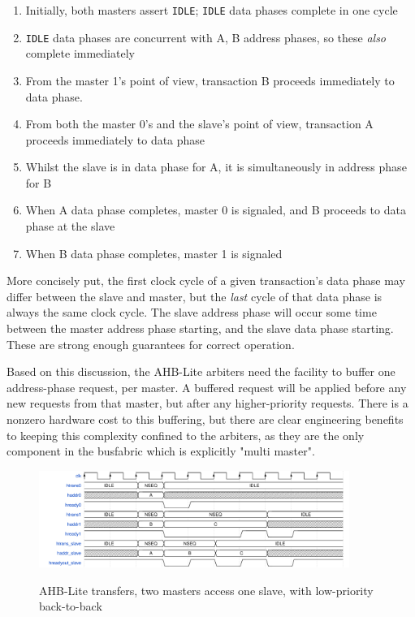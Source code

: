 \documentclass[notitlepage]{article}
\begin{document}
\begin{enumerate}
	\item Initially, both masters assert \texttt{IDLE}; \texttt{IDLE} data phases complete in one cycle
	\item \texttt{IDLE} data phases are concurrent with A, B address phases, so these \textit{also} complete immediately
	\item From the master 1's point of view, transaction B proceeds immediately to data phase.
	\item From both the master 0's and the slave's point of view, transaction A proceeds immediately to data phase
	\item Whilst the slave is in data phase for A, it is simultaneously in address phase for B
	\item When A data phase completes, master 0 is signaled, and B proceeds to data phase at the slave
	\item When B data phase completes, master 1 is signaled
\end{enumerate}

More concisely put, the first clock cycle of a given transaction's data phase may differ between the slave and master, but the \textit{last} cycle of that data phase is always the same clock cycle. The slave address phase will occur some time between the master address phase starting, and the slave data phase starting. These are strong enough guarantees for correct operation.

Based on this discussion, the AHB-Lite arbiters need the facility to buffer one address-phase request, per master. A buffered request will be applied before any new requests from that master, but after any higher-priority requests. There is a nonzero hardware cost to this buffering, but there are clear engineering benefits to keeping this complexity confined to the arbiters, as they are the only component in the busfabric which is explicitly "multi master".

\begin{figure}[H]
\centering
\caption{AHB-Lite transfers, two masters access one slave, with low-priority back-to-back}
\includegraphics[width=0.9\textwidth]{waves/ahbl_mm_simult2.pdf}
\label{diagram:ahbl_mm_simult2}
\end{figure}
\end{document}

